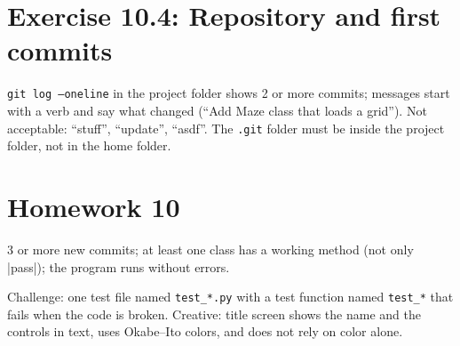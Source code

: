 \section{Exercise 10.4: Repository and first commits}
\begin{answer}[Check]
\texttt{git log --oneline} in the project folder shows 2 or more commits; messages start with a verb and say what changed (\enquote{Add Maze class that loads a grid}). Not acceptable: \enquote{stuff}, \enquote{update}, \enquote{asdf}. The \texttt{.git} folder must be inside the project folder, not in the home folder.
\end{answer}

\section{Homework 10}
\begin{answer}[Core]
3 or more new commits; at least one class has a working method (not only \py|pass|); the program runs without errors.
\end{answer}
\begin{answer}
Challenge: one test file named \texttt{test\_*.py} with a test function named \texttt{test\_*} that fails when the code is broken. Creative: title screen shows the name and the controls in text, uses Okabe--Ito colors, and does not rely on color alone.
\end{answer}
